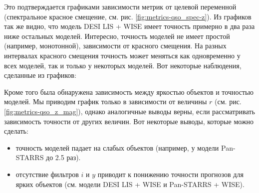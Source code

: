\documentclass[fleqn,usenatbib]{mnras}
\begin{document}
Это подтверждается графиками зависимости метрик от целевой переменной (спектральное красное смещение, см. рис. \ref{fig:metrics-qso_spec-z}). Из графиков так же видно, что модель DESI LIS + WISE имеет точность примерно в два раза ниже остальных моделей. Интересно, точность моделей не имеет простой (например, монотонной), зависимости от красного смещения. На разных интервалах красного смещения точность может меняться как одновременно у всех моделей, так и только у некоторых моделей. Вот некоторые наблюдения, сделанные из графиков:


Кроме того была обнаружена зависимость между яркостью объектов и точностью моделей. Мы приводим график только в зависимости от величины $r$ (см. рис. \ref{fig:metrics-qso_z_mag}), однако аналогичные выводы верны, если рассматривать зависимость точности от других величин. Вот некоторые выводы, которые можно сделать:
\begin{itemize}
    \item точность моделей падает на слабых объектов (например, у модели Pan-STARRS до 2.5 раз).
    \item отсутствие фильтров $i$ и $y$ приводит к понижению точности прогнозов для ярких объектов (см. модели DESI LIS + WISE и Pan-STARRS + WISE).
\end{itemize}
\end{document}
